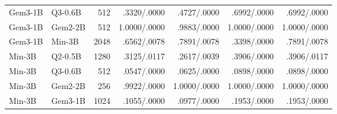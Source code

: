 \begin{longtable}{@{}llrrrrr@{}}
\rowcolor{rowII} Gem3-1B & Q3-0.6B & 512 & .3320/.0000 & .4727/.0000 & .6992/.0000 & .6992/.0000 \\
\rowcolor{rowII} Gem3-1B & Gem2-2B & 512 & 1.0000/.0000 & .9883/.0000 & 1.0000/.0000 & 1.0000/.0000 \\
\rowcolor{rowII} Gem3-1B & Min-3B & 2048 & .6562/.0078 & .7891/.0078 & .3398/.0000 & .7891/.0078 \\
\rowcolor{rowIP} Min-3B & Q2-0.5B & 1280 & .3125/.0117 & .2617/.0039 & .3906/.0000 & .3906/.0117 \\
\rowcolor{rowII} Min-3B & Q3-0.6B & 512 & .0547/.0000 & .0625/.0000 & .0898/.0000 & .0898/.0000 \\
\rowcolor{rowII} Min-3B & Gem2-2B & 256 & .9922/.0000 & 1.0000/.0000 & 1.0000/.0000 & 1.0000/.0000 \\
\rowcolor{rowII} Min-3B & Gem3-1B & 1024 & .1055/.0000 & .0977/.0000 & .1953/.0000 & .1953/.0000 \\
\end{longtable}
\endgroup
